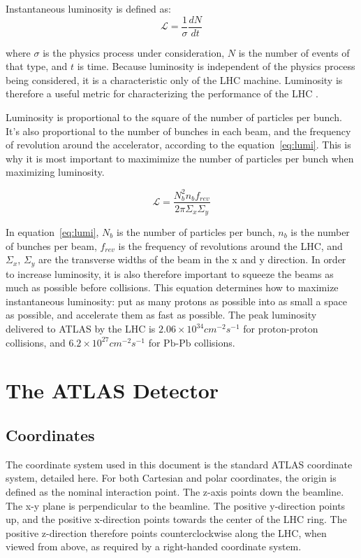 Instantaneous luminosity is defined as:
\begin{equation}
\mathcal{L} = \frac{1}{\sigma}\frac{dN}{dt}
\end{equation}

\noindent where $\sigma$ is the physics process under consideration, $N$ is the number of events of that type, and $t$ is time.
Because luminosity is independent of the physics process being considered, it is a characteristic only of the LHC machine.
Luminosity is therefore a useful metric for characterizing the performance of the LHC .

Luminosity is proportional to the square of the number of particles per bunch.
It's also proportional to the number of bunches in each beam, and the frequency of revolution around the accelerator, according to the equation~\ref{eq:lumi}.
This is why it is most important to maximimize the number of particles per bunch when maximizing luminosity.

\begin{equation}\label{eq:lumi}
\mathcal{L} = \frac{N_b^2 n_b f_{rev}}{2\pi \Sigma_x \Sigma_y}
\end{equation}

In equation~\ref{eq:lumi}, $N_b$ is the number of particles per bunch, $n_b$ is the number of bunches per beam, $f_{rev}$ is the frequency of revolutions around the LHC, and $\Sigma_x$, $\Sigma_y$ are the transverse widths of the beam in the x and y direction.
In order to increase luminosity, it is also therefore important to squeeze the beams as much as possible before collisions.
This equation determines how to maximize instantaneous luminosity: put as many protons as possible into as small a space as possible, and accelerate them as fast as possible.
The peak luminosity delivered to ATLAS by the LHC is $2.06\times10^{34}cm^{-2}s^{-1}$ for proton-proton collisions, and $6.2\times10^{27}cm^{-2}s^{-1}$ for $\mathrm{Pb}$-$\mathrm{Pb}$ collisions.

\section{The ATLAS Detector}\label{sec:atlas_detector}
\subsection{Coordinates}\label{subsec:coordinates}
The coordinate system used in this document is the standard ATLAS coordinate system, detailed here.
For both Cartesian and polar coordinates, the origin is defined as the nominal interaction point.
The z-axis points down the beamline.
The x-y plane is perpendicular to the beamline.
The positive y-direction points up, and the positive x-direction points towards the center of the LHC ring.
The positive z-direction therefore points counterclockwise along the LHC, when viewed from above,
as required by a right-handed coordinate system.

